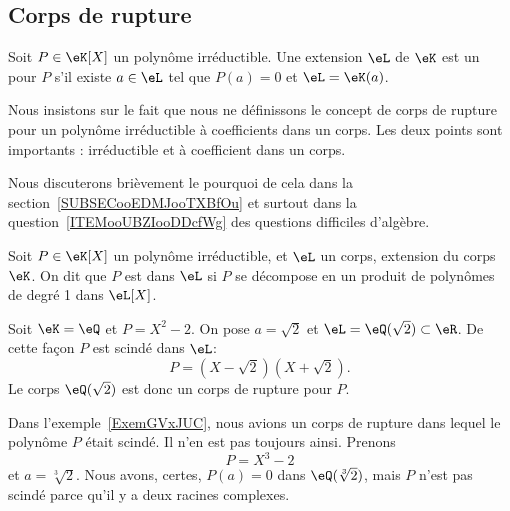 \subsection{Corps de rupture}

\begin{definition}      \label{DEFooVALTooDJJmJv}
    Soit \( P\in\eK[X]\) un polynôme irréductible. Une extension \( \eL\) de \( \eK\) est un  pour \( P\) s'il existe \( a\in \eL\) tel que \( P(a)=0\) et \( \eL=\eK(a)\).
\end{definition}

\begin{normaltext}      \label{NORMALooTPOIooVZAfUo}
    Nous insistons sur le fait que nous ne définissons le concept de corps de rupture pour un polynôme irréductible à coefficients dans un corps. Les deux points sont importants : irréductible et à coefficient dans un corps.

    Nous discuterons brièvement le pourquoi de cela dans la section~\ref{SUBSECooEDMJooTXBfOu} et surtout dans la question~\ref{ITEMooUBZIooDDcfWg} des questions difficiles d'algèbre.
\end{normaltext}

\begin{definition}\label{DefPolynomeScinde}
  Soit \( P\in\eK[X]\) un polynôme irréductible, et \( \eL\) un corps, extension du corps \( \eK\). On dit que \( P \) est  dans \( \eL \) si \( P \) se décompose en un produit de polynômes de degré 1 dans \( \eL[X]\).
\end{definition}

\begin{example}     \label{ExemGVxJUC}
    Soit \( \eK=\eQ\) et \( P=X^2-2\). On pose \( a=\sqrt{2}\) et \( \eL=\eQ(\sqrt{2})\subset\eR\). De cette façon \( P\) est scindé dans \( \eL \):
    \begin{equation}
        P=(X-\sqrt{2})(X+\sqrt{2}).
    \end{equation}
    Le corps \( \eQ(\sqrt{2})\) est donc un corps de rupture pour \( P\).
\end{example}

\begin{example}
    Dans l'exemple~\ref{ExemGVxJUC}, nous avions un corps de rupture dans lequel le polynôme \( P\) était scindé. Il n'en est pas toujours ainsi. Prenons
    \begin{equation}
        P=X^3-2
    \end{equation}
    et \( a=\sqrt[3]{2}\). Nous avons, certes, \( P(a)=0\) dans \( \eQ(\sqrt[3]{2})\), mais \( P\) n'est pas scindé parce qu'il y a deux racines complexes.
\end{example}

